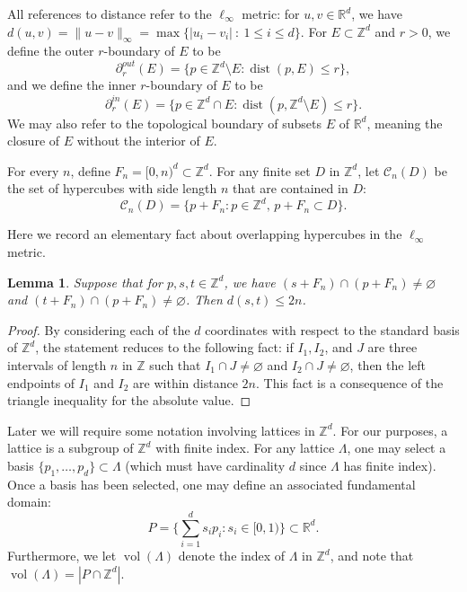 \documentclass[12pt]{amsart}
\newtheorem{lemma}[theorem]{Lemma}
\theoremstyle{definition}
\def\Z{\mathbb{Z}}
\DeclareMathOperator{\dist}{dist}
\DeclareMathOperator{\vol}{vol}
\begin{document}
All references to distance refer to the $\ell_{\infty}$ metric: for $u, v \in \mathbb{R}^d$, we have $d(u,v) = \|u - v \|_{\infty} =  \max\{|u_i - v_i| \ : \ 1 \leq i \leq d\}$.
For $E \subset \mathbb{Z}^d$ and $r>0$, we define the outer $r$-boundary of $E$ to be
\begin{equation*}
\partial^{out}_r(E) = \{p \in \mathbb{Z}^d \setminus E : \dist(p,E) \leq r\},
\end{equation*}
and we define the inner $r$-boundary of $E$ to be
\begin{equation*}
\partial^{in}_r(E) = \{ p \in \mathbb{Z}^d \cap E : \dist(p, \mathbb{Z}^d \setminus E) \leq r\}.
\end{equation*}
We may also refer to the topological boundary of subsets $E$ of $\mathbb{R}^d$, meaning the closure of $E$ without the interior of $E$.

For every $n$, define $F_n = [0,n)^d \subset \mathbb{Z}^d$. For any finite set $D$ in $\mathbb{Z}^d$, let $\mathcal{C}_n(D)$ be the set of hypercubes with side length $n$ that are contained in $D$:
\begin{equation*}
\mathcal{C}_n(D) = \{ p + F_n : p \in \mathbb{Z}^d, \, p + F_n \subset D\}.
\end{equation*}

Here we record an elementary fact about overlapping hypercubes in the $\ell_{\infty}$ metric.
\begin{lemma} \label{Lemma:Woods}
Suppose that for $p,s,t \in \mathbb{Z}^d$, we have $(s+F_n) \cap (p+F_n) \neq \varnothing$ and $(t+F_n) \cap (p+F_n) \neq \varnothing$. Then $d(s,t) \leq 2n$.
\end{lemma} 
\begin{proof}
By considering each of the $d$ coordinates with respect to the standard basis of $\mathbb{Z}^d$, the statement reduces to the following fact: if $I_1, I_2$, and $J$ are three intervals of length $n$ in $\Z$ such that $I_1 \cap J \neq \varnothing$ and $I_2 \cap J \neq \varnothing$, then the left endpoints of $I_1$ and $I_2$ are within distance $2n$. This fact is a consequence of the triangle inequality for the absolute value.
\end{proof}

Later we will require some notation involving lattices in $\mathbb{Z}^d$. For our purposes, a lattice is a subgroup of $\mathbb{Z}^d$ with finite index. For any lattice $\Lambda$, one may select a basis $\{p_1,\dots,p_d\} \subset \Lambda$ (which must have cardinality $d$ since $\Lambda$ has finite index). Once a basis has been selected, one may define an associated fundamental domain:
\begin{equation*}
P = \Biggl\{ \sum_{i=1}^d s_i p_i : s_i \in [0,1) \Biggr\} \subset \mathbb{R}^d.
\end{equation*}
Furthermore, we let $\vol(\Lambda)$ denote the index of $\Lambda$ in $\mathbb{Z}^d$, and note that $\vol(\Lambda) = | P \cap \mathbb{Z}^d |$. 
\end{document}
